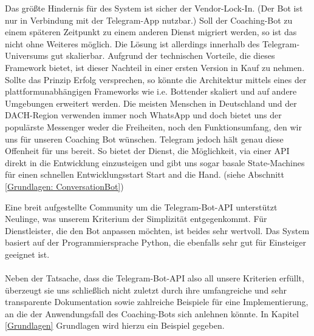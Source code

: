         Das größte Hindernis für des System ist sicher der Vendor-Lock-In. (Der Bot ist nur in Verbindung mit der Telegram-App nutzbar.) Soll der Coaching-Bot zu einem späteren Zeitpunkt zu einem anderen Dienst migriert werden, so ist das nicht ohne Weiteres möglich. Die Lösung ist allerdings innerhalb des Telegram-Universums gut skalierbar. Aufgrund der technischen Vorteile, die dieses Framework bietet, ist dieser Nachteil in einer ersten Version in Kauf zu nehmen. Sollte das Prinzip Erfolg versprechen, so könnte die Architektur mittels eines der plattformunabhängigen Frameworks wie i.e. Bottender skaliert und auf andere Umgebungen erweitert werden.
        Die meisten Menschen in Deutschland und der DACH-Region verwenden immer noch WhatsApp \cite{Nutzerzahlen} und doch bietet uns der populärste Messenger weder die Freiheiten, noch den Funktionsumfang, den wir uns für unseren Coaching Bot wünschen. Telegram jedoch hält genau diese Offenheit für uns bereit. \cite{telegramVergleich} So bietet der Dienst, die Möglichkeit, via einer API direkt in die Entwicklung einzusteigen und gibt uns sogar basale State-Machines für einen schnellen Entwicklungsstart Start and die Hand. (siehe Abschnitt \ref*{Grundlagen: ConversationBot})
        
        Eine breit aufgestellte Community um die Telegram-Bot-API unterstützt Neulinge, was unserem Kriterium der Simplizität entgegenkommt. Für Dienstleister, die den Bot anpassen möchten, ist beides sehr wertvoll. Das System basiert auf der Programmiersprache Python, die ebenfalls sehr gut für Einsteiger geeignet ist. \\ \\
        
        Neben der Tatsache, dass die Telegram-Bot-API also all unsere Kriterien erfüllt, überzeugt sie uns schließlich nicht zuletzt durch ihre umfangreiche und sehr transparente Dokumentation sowie zahlreiche Beispiele für eine Implementierung, an die der Anwendungsfall des Coaching-Bots sich anlehnen könnte. In Kapitel \ref*{Grundlagen} Grundlagen wird hierzu ein Beispiel gegeben.

        
         
    